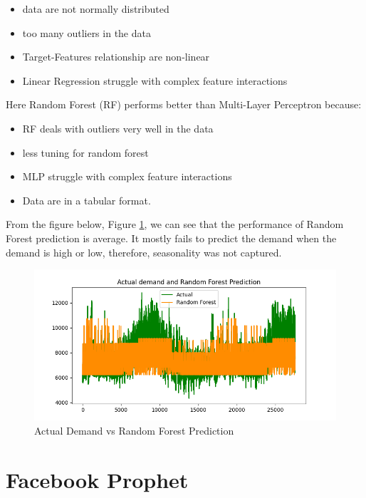 \documentclass[mstat,12pt]{unswthesis}
\begin{document}
\begin{itemize}
\tightlist
\item
  data are not normally distributed
\item
  too many outliers in the data
\item
  Target-Features relationship are non-linear
\item
  Linear Regression struggle with complex feature interactions
\end{itemize}

Here Random Forest (RF) performs better than Multi-Layer Perceptron
because:

\begin{itemize}
\tightlist
\item
  RF deals with outliers very well in the data
\item
  less tuning for random forest
\item
  MLP struggle with complex feature interactions
\item
  Data are in a tabular format.
\end{itemize}

From the figure below, Figure
\ref{fig:actual-demand-vs-random-forest-prediction}, we can see that the
performance of Random Forest prediction is average. It mostly fails to
predict the demand when the demand is high or low, therefore,
seasonality was not captured.

\begin{figure}[H]
\includegraphics[width=1\linewidth,]{images/Actual_Demand_vs_Random_Forest_Prediction} \caption{Actual Demand vs Random Forest Prediction}\label{fig:actual-demand-vs-random-forest-prediction}
\end{figure}

\hypertarget{facebook-prophet-1}{%
\section{Facebook Prophet}\label{facebook-prophet-1}}
\end{document}
